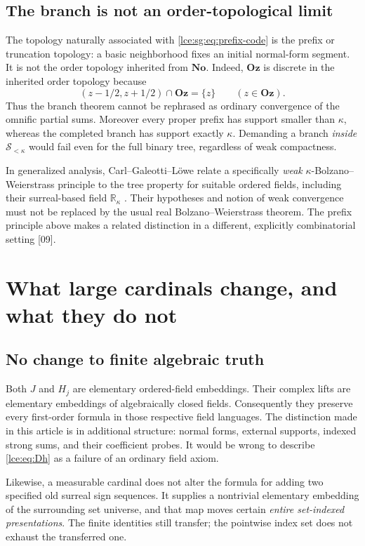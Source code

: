 \documentclass[11pt,letterpaper]{article}
\numberwithin{equation}{section}
\theoremstyle{definition}
\theoremstyle{remark}
\newcommand{\No}{\mathbf{No}}
\newcommand{\Oz}{\mathbf{Oz}}
\newcommand{\R}{\mathbb R}
\newcommand{\Sk}{\mathscr S_{<\kappa}}
\newcommand{\src}[1]{\textup{\textsf{\small[#1]}}}%
\begin{document}
\subsection{The branch is not an order-topological limit}
The topology naturally associated with \eqref{lce:sg:eq:prefix-code} is the
prefix or truncation topology: a basic neighborhood fixes an initial
normal-form segment. It is not the order topology inherited from $\No$.
Indeed, $\Oz$ is discrete in the inherited order topology because
\[
 (z-1/2,z+1/2)\cap\Oz=\{z\}\qquad(z\in\Oz).
\]
Thus the branch theorem cannot be rephrased as ordinary convergence of the
omnific partial sums. Moreover every proper prefix has support smaller than
$\kappa$, whereas the completed branch has support exactly $\kappa$.
Demanding a branch \emph{inside} $\Sk$ would fail even for the full binary
tree, regardless of weak compactness.

In generalized analysis, Carl--Galeotti--L\"owe relate a specifically
\emph{weak} $\kappa$-Bolzano--Weierstrass principle to the tree property for
suitable ordered fields, including their surreal-based field $\R_\kappa$
\cite{CGL}. Their hypotheses and notion of weak convergence must not be
replaced by the usual real Bolzano--Weierstrass theorem. The prefix
principle above makes a related distinction in a different, explicitly
combinatorial setting \src{09}.

\section{What large cardinals change, and what they do not}\label{lce:sec:interpretation}

\subsection{No change to finite algebraic truth}
Both $J$ and $H_j$ are elementary ordered-field embeddings. Their complex
lifts are elementary embeddings of algebraically closed fields. Consequently
they preserve every first-order formula in those respective field
languages. The distinction made in this article is in additional structure:
normal forms, external supports, indexed strong sums, and their coefficient
probes. It would be wrong to describe \eqref{lce:eq:Dh} as a failure of an
ordinary field axiom.

Likewise, a measurable cardinal does not alter the formula for adding two
specified old surreal sign sequences. It supplies a nontrivial elementary
embedding of the surrounding set universe, and that map moves certain
\emph{entire set-indexed presentations}. The finite identities still
transfer; the pointwise index set does not exhaust the transferred one.
\end{document}
